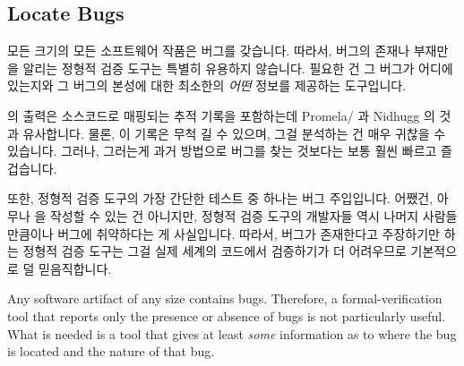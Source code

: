 \iffalse

It would of course be quite useful for tools to automatically divide
up large programs, verify the pieces, and then verify the combinations
of pieces.
In the meantime, verification of large programs will require significant
manual intervention.
This intervention will preferably mediated by scripting, the better to
reliably carry out repeated verifications on each release, and
preferably eventually in a manner well-suited for continuous integration.
And Facebook's Infer tool has taken important steps towards doing just
that, via compositionality and
abstraction~\cite{SamBlackshear2018RacerD,DinoDistefano2019FBstaticAnalysis}.

In any case, we can expect formal-verification capabilities to continue
to increase over time, and any such increases will in turn increase
the applicability of formal verification to regression testing.

\fi

\subsection{Locate Bugs}
\label{sec:future:Locate Bugs}

모든 크기의 모든 소프트웨어 작품은 버그를 갖습니다.
따라서, 버그의 존재나 부재만을 알리는 정형적 검증 도구는 특별히 유용하지
않습니다.
필요한 건 그 버그가 어디에 있는지와 그 버그의 본성에 대한 최소한의 \emph{어떤}
정보를 제공하는 도구입니다.

 의 출력은 소스코드로 매핑되는 추적 기록을 포함하는데
Promela/ 과 Nidhugg 의 것과 유사합니다.
물론, 이 기록은 무척 길 수 있으며, 그걸 분석하는 건 매우 귀찮을 수 있습니다.
그러나, 그러는게 과거 방법으로 버그를 찾는 것보다는 보통 훨씬 빠르고
즐겁습니다.

또한, 정형적 검증 도구의 가장 간단한 테스트 중 하나는 버그 주입입니다.
어쨌건, 아무나  을 작성할 수 있는 건 아니지만, 정형적
검증 도구의 개발자들 역시 나머지 사람들 만큼이나 버그에 취약하다는 게
사실입니다.
따라서, 버그가 존재한다고 주장하기만 하는 정형적 검증 도구는 그걸 실제 세계의
코드에서 검증하기가 더 어려우므로 기본적으로 덜 믿음직합니다.

\iffalse

Any software artifact of any size contains bugs.
Therefore, a formal-verification tool that reports only the
presence or absence of bugs is not particularly useful.
What is needed is a tool that gives at least \emph{some} information
as to where the bug is located and the nature of that bug.

